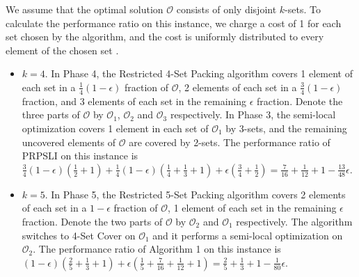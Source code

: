 \documentclass[runningheads,a4paper]{llncs}
\numberwithin{equation}{section}
\begin{document}
We assume that the optimal solution $\mathscr{O}$ consists of only disjoint $k$-sets. To calculate the performance ratio on this instance, we charge a cost of 1 for each set chosen by the algorithm, and the cost is uniformly distributed to every element of the chosen set \cite{furer}.

\begin{itemize}

    \item \textbf{$k=4$}. In Phase 4, the Restricted 4-Set Packing algorithm covers 1 element of each set in a $\frac{1}{4}(1-\epsilon)$ fraction of $\mathscr{O}$, 2 elements of each set in a $\frac{3}{4}(1-\epsilon)$ fraction, and 3 elements of each set in the remaining $\epsilon$ fraction. Denote the three parts of $\mathscr{O}$ by $\mathscr{O}_1$, $\mathscr{O}_2$ and $\mathscr{O}_3$ respectively. In Phase 3, the semi-local optimization covers 1 element in each set of $\mathscr{O}_1$ by 3-sets, and the remaining uncovered elements of $\mathscr{O}$ are covered by 2-sets. The performance ratio of PRPSLI on this instance is $\frac{3}{4}(1-\epsilon)(\frac{1}{2}+1)+\frac{1}{4}(1-\epsilon)(\frac{1}{4}+\frac{1}{3}+1)+\epsilon(\frac{3}{4}+\frac{1}{2})=\frac{7}{16}+\frac{1}{12}+1-\frac{13}{48}\epsilon$. \\

    \item \textbf{$k=5$}. In Phase 5, the Restricted 5-Set Packing algorithm covers 2 elements of each set in a $1-\epsilon$ fraction of $\mathscr{O}$, 1 element of each set in the remaining $\epsilon$ fraction. Denote the two parts of $\mathscr{O}$ by $\mathscr{O}_2$ and $\mathscr{O}_1$ respectively. The algorithm switches to 4-Set Cover on $\mathscr{O}_1$ and it performs a semi-local optimization on $\mathscr{O}_2$. The performance ratio of Algorithm 1 on this instance is $(1-\epsilon)(\frac{2}{5}+\frac{1}{3}+1)+\epsilon(\frac{1}{5}+\frac{7}{16}+\frac{1}{12}+1)=\frac{2}{5}+\frac{1}{3}+1-\frac{1}{80}\epsilon$. \\


\end{itemize}
\end{document}
